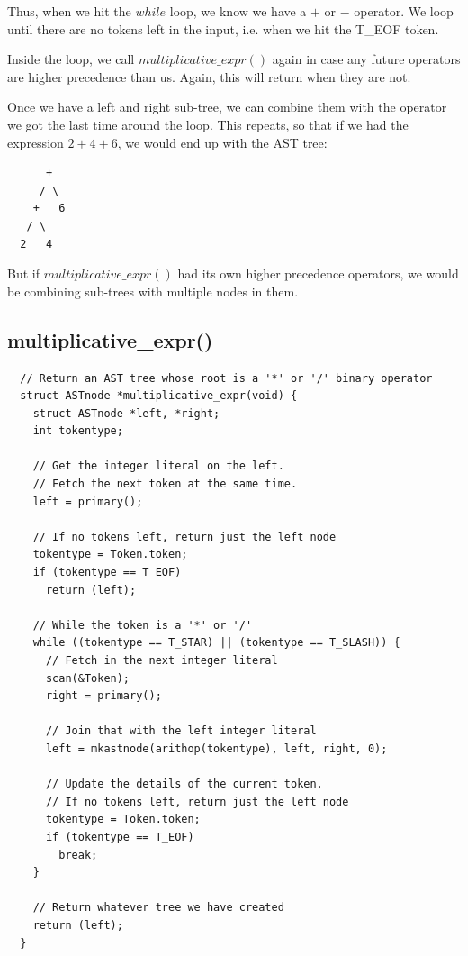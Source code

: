 \documentclass[journal, onecolumn, 12pt]{IEEEtran}
\begin{document}
Thus, when we hit the $while$ loop, we know we have a $+$ or $-$ operator. We loop until there are no tokens left in the input, i.e. when we hit the T\_EOF token.

Inside the loop, we call $multiplicative\_expr()$ again in case any future operators are higher precedence than us. Again, this will return when they are not.

Once we have a left and right sub-tree, we can combine them with the operator we got the last time around the loop. This repeats, so that if we had the expression $2+4+6$, we would end up with the AST tree:

\begin{lstlisting}
      +
     / \
    +   6
   / \
  2   4
\end{lstlisting}

But if $multiplicative\_expr()$ had its own higher precedence operators, we would be combining sub-trees with multiple nodes in them.

\subsection{multiplicative\_expr()}

\begin{lstlisting}
  // Return an AST tree whose root is a '*' or '/' binary operator
  struct ASTnode *multiplicative_expr(void) {
    struct ASTnode *left, *right;
    int tokentype;
  
    // Get the integer literal on the left.
    // Fetch the next token at the same time.
    left = primary();
  
    // If no tokens left, return just the left node
    tokentype = Token.token;
    if (tokentype == T_EOF)
      return (left);
  
    // While the token is a '*' or '/'
    while ((tokentype == T_STAR) || (tokentype == T_SLASH)) {
      // Fetch in the next integer literal
      scan(&Token);
      right = primary();
  
      // Join that with the left integer literal
      left = mkastnode(arithop(tokentype), left, right, 0);
  
      // Update the details of the current token.
      // If no tokens left, return just the left node
      tokentype = Token.token;
      if (tokentype == T_EOF)
        break;
    }
  
    // Return whatever tree we have created
    return (left);
  }
\end{lstlisting}
\end{document}
